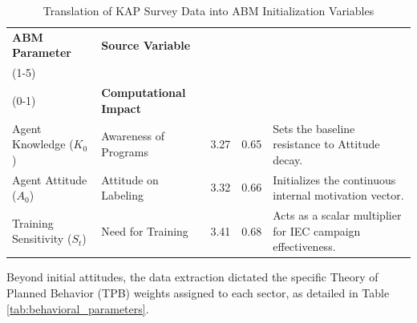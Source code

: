 \begin{table}[H]
    \centering
    \caption{Translation of KAP Survey Data into ABM Initialization Variables}
    \label{tab:kap_translation}
    \small
    \renewcommand{\arraystretch}{1.15} 
    \begin{tabularx}{\textwidth}{ 
        >{\raggedright\arraybackslash}p{2.8cm} 
        >{\raggedright\arraybackslash}p{3.2cm} 
        c 
        c 
        >{\raggedright\arraybackslash}X 
    }
        \toprule
        \textbf{ABM Parameter} & \textbf{Source Variable} & \makecell{\textbf{Mean} \\ (1-5)} & \makecell{\textbf{Norm.} \\ (0-1)} & \textbf{Computational Impact} \\
        \midrule
        Agent Knowledge ($K_0$) & Awareness of Programs & 3.27 & 0.65 & Sets the baseline resistance to Attitude decay. \\
        Agent Attitude ($A_0$) & Attitude on Labeling & 3.32 & 0.66 & Initializes the continuous internal motivation vector. \\
        Training Sensitivity ($S_t$) & Need for Training & 3.41 & 0.68 & Acts as a scalar multiplier for IEC campaign effectiveness. \\
        \bottomrule
    \end{tabularx}
\end{table}

Beyond initial attitudes, the data extraction dictated the specific Theory of Planned Behavior (TPB) weights assigned to each sector, as detailed in Table \ref{tab:behavioral_parameters}. 

